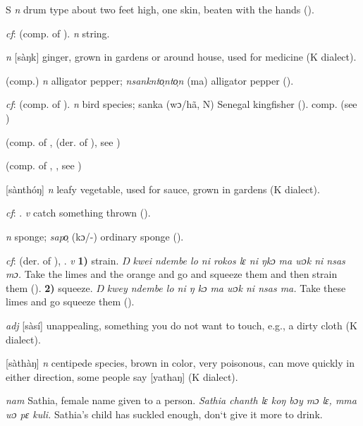 \begin{letter}{S}
 \textit{n} drum type about two feet high, one skin, beaten with the hands (\citealt{Pichl1967}). 

 \textit{cf}:  (comp. of ). \textit{n} string.

 \textit{n} [sàŋk] ginger, grown in gardens or around house, used for medicine (K dialect).

 (comp.) \textit{n} alligator pepper; \textit{nsanknto̹nto̹n} (ma) alligator pepper (\citealt{Pichl1967}). 

 \textit{cf}:  (comp. of ). \textit{n} bird species; sanka (wɔ/hã, N) Senegal kingfisher (\citealt{Pichl1967}). comp.  (see ) 

 (comp. of ,  (der. of ), see ) 

 (comp. of , , see ) 

 [sànthóŋ] \textit{n} leafy vegetable, used for sauce, grown in gardens (K dialect).

 \textit{cf}: . \textit{v} catch something thrown (\citealt{Pichl1967}). 

 \textit{n} sponge; \textit{sapo̹} (kɔ/-) ordinary sponge (\citealt{Pichl1967}). 

 \textit{cf}:  (der. of ), . \textit{v} \textbf{1)} strain. \textit{Ŋ kwei ndembe lo ni rokos lɛ ni ŋkɔ ma wɔk ni nsas mɔ.} Take the limes and the orange and go and squeeze them and then strain them (\citealt{Pichl1967}). \textbf{2)} squeeze. \textit{Ŋ kwey ndembe lo ni ŋ kɔ ma wɔk ni nsas ma.} Take these limes and go squeeze them (\citealt{Pichl1967}). 

 \textit{adj} [sàsí] unappealing, something you do not want to touch, e.g., a dirty cloth (K dialect). 

 [sàthàŋ] \textit{n} centipede species, brown in color, very poisonous, can move quickly in either direction, some people say [yathaŋ] (K dialect). 

 \textit{nam} Sathia, female name given to a person. \textit{Sathia chanth lɛ koŋ bɔy mɔ lɛ, mma wɔ pɛ kuli.} Sathia's child has suckled enough, don‘t give it more to drink.


\end{letter}
